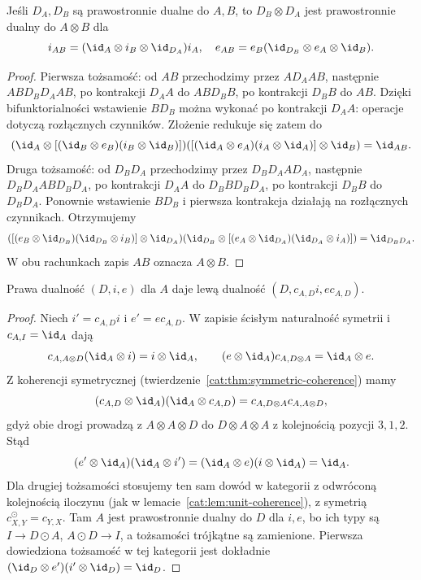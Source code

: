 \begin{stwierdzenie}\label{cat:prop:dual-tensor}
Jeśli $D_A,D_B$ są prawostronnie dualne do $A,B$, to $D_B\otimes D_A$ jest prawostronnie dualny do $A\otimes B$ dla
\[
i_{AB}=(\id_A\otimes i_B\otimes\id_{D_A})i_A,\quad
e_{AB}=e_B(\id_{D_B}\otimes e_A\otimes\id_B).
\]
\end{stwierdzenie}
\begin{proof}
Pierwsza tożsamość: od $AB$ przechodzimy przez $AD_AAB$, następnie $ABD_BD_AAB$, po kontrakcji $D_AA$ do $ABD_BB$, po kontrakcji $D_BB$ do $AB$. Dzięki bifunktorialności wstawienie $BD_B$ można wykonać po kontrakcji $D_AA$: operacje dotyczą rozłącznych czynników. Złożenie redukuje się zatem do
\[
(\id_A\otimes[(\id_B\otimes e_B)(i_B\otimes\id_B)])
([(\id_A\otimes e_A)(i_A\otimes\id_A)]\otimes\id_B)=\id_{AB}.
\]
Druga tożsamość: od $D_BD_A$ przechodzimy przez $D_BD_AAD_A$, następnie $D_BD_AABD_BD_A$, po kontrakcji $D_AA$ do $D_BBD_BD_A$, po kontrakcji $D_BB$ do $D_BD_A$. Ponownie wstawienie $BD_B$ i pierwsza kontrakcja działają na rozłącznych czynnikach. Otrzymujemy
\[
([(e_B\otimes\id_{D_B})(\id_{D_B}\otimes i_B)]\otimes\id_{D_A})
(\id_{D_B}\otimes[(e_A\otimes\id_{D_A})(\id_{D_A}\otimes i_A)])=\id_{D_BD_A}.
\]
W obu rachunkach zapis $AB$ oznacza $A\otimes B$.
\end{proof}
\begin{stwierdzenie}\label{cat:prop:symmetric-left-dual}
Prawa dualność $(D,i,e)$ dla $A$ daje lewą dualność $(D,c_{A,D}i,e c_{A,D})$.
\end{stwierdzenie}
\begin{proof}
Niech $i'=c_{A,D}i$ i $e'=e c_{A,D}$. W zapisie ścisłym naturalność symetrii i $c_{A,I}=\id_A$ dają
\[
c_{A,A\otimes D}(\id_A\otimes i)=i\otimes\id_A,\qquad
(e\otimes\id_A)c_{A,D\otimes A}=\id_A\otimes e.
\]
Z koherencji symetrycznej (twierdzenie~\ref{cat:thm:symmetric-coherence}) mamy
\[
(c_{A,D}\otimes\id_A)(\id_A\otimes c_{A,D})
=c_{A,D\otimes A}c_{A,A\otimes D},
\]
gdyż obie drogi prowadzą z $A\otimes A\otimes D$ do $D\otimes A\otimes A$ z kolejnością pozycji $3,1,2$. Stąd
\[
(e'\otimes\id_A)(\id_A\otimes i')=(\id_A\otimes e)(i\otimes\id_A)=\id_A.
\]
Dla drugiej tożsamości stosujemy ten sam dowód w kategorii z odwróconą kolejnością iloczynu (jak w lemacie~\ref{cat:lem:unit-coherence}), z symetrią $c^\odot_{X,Y}=c_{Y,X}$. Tam $A$ jest prawostronnie dualny do $D$ dla $i,e$, bo ich typy są $I\to D\odot A$, $A\odot D\to I$, a tożsamości trójkątne są zamienione. Pierwsza dowiedziona tożsamość w tej kategorii jest dokładnie $(\id_D\otimes e')(i'\otimes\id_D)=\id_D$.
\end{proof}

